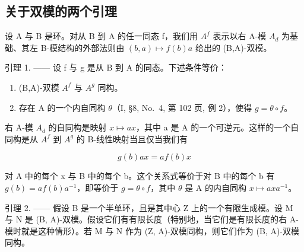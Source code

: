 \subsection{关于双模的两个引理}

设 A 与 B 是环。对从 B 到 A 的任一同态 f，我们用 \(A^{f}\) 表示以右 A-模 \(A_{d}\) 为基础、其左 B-模结构的外部法则由 \((b,a)\mapsto f(b)a\) 给出的 (B,A)-双模。

引理 1. —— 设 f 与 g 是从 B 到 A 的同态。下述条件等价：

\begin{enumerate}
\def\labelenumi{(\roman{enumi})}
\item
  (B,A)-双模 \(A^{f}\) 与 \(A^{g}\) 同构。
\item
  存在 A 的一个内自同构 \(\theta\)（I, §8, No.~4, 第 102 页, 例 2），使得 \(g = \theta \circ f\)。
\end{enumerate}

右 A-模 \(A_{d}\) 的自同构是映射 \(x \mapsto ax\)，其中 a 是 A 的一个可逆元。这样的一个自同构是从 \(A^{f}\) 到 \(A^{g}\) 的 B-线性映射当且仅当我们有

\[
g (b) a x = a f (b) x
\]

对 A 中的每个 x 与 B 中的每个 b。这个关系式等价于对 B 中的每个 b 有 \(g(b) = af(b)a^{-1}\)，即等价于 \(g = \theta \circ f\)，其中 \(\theta\) 是 A 的内自同构 \(x \mapsto axa^{-1}\)。

引理 2. —— 假设 B 是一个半单环，且是其中心 Z 上的一个有限生成模。设 M 与 N 是 (B, A)-双模。假设它们有有限长度（特别地，当它们是有限长度的右 A-模时就是这种情形）。若 M 与 N 作为 (Z, A)-双模同构，则它们作为 (B, A)-双模同构。

